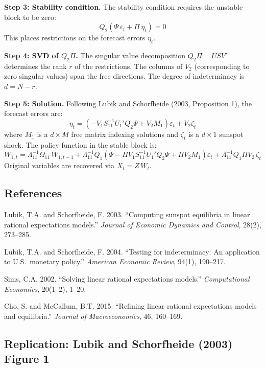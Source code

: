 \documentclass{article}
\begin{document}
\medskip
\noindent\textbf{Step 3: Stability condition.} The stability condition requires the unstable block to be zero:
\[
Q_2 (\Psi \, \varepsilon_t + \Pi \, \eta_t) = 0
\]
This places restrictions on the forecast errors $\eta_t$.

\medskip
\noindent\textbf{Step 4: SVD of $Q_2 \Pi$.} The singular value decomposition $Q_2 \Pi = U S V'$ determines the rank $r$ of the restrictions. The columns of $V_2$ (corresponding to zero singular values) span the free directions. The degree of indeterminacy is $d = N - r$.

\medskip
\noindent\textbf{Step 5: Solution.} Following Lubik and Schorfheide (2003, Proposition 1), the forecast errors are:
\[
\eta_t = \left(-V_1 S_{11}^{-1} U_1' Q_2 \Psi + V_2 M_1\right) \varepsilon_t + V_2 \zeta_t
\]
where $M_1$ is a $d \times M$ free matrix indexing solutions and $\zeta_t$ is a $d \times 1$ sunspot shock. The policy function in the stable block is:
\[
W_{1,t} = \Lambda_{11}^{-1} \Omega_{11} \, W_{1,t-1} + \Lambda_{11}^{-1} Q_1 \left(\Psi - \Pi V_1 S_{11}^{-1} U_1' Q_2 \Psi + \Pi V_2 M_1\right) \varepsilon_t + \Lambda_{11}^{-1} Q_1 \Pi V_2 \, \zeta_t
\]
Original variables are recovered via $X_t = Z \, W_t$.

\subsection{References}

Lubik, T.A. and Schorfheide, F. 2003. ``Computing sunspot equilibria in linear rational expectations models.'' \textit{Journal of Economic Dynamics and Control}, 28(2), 273--285.

\medskip
\noindent Lubik, T.A. and Schorfheide, F. 2004. ``Testing for indeterminacy: An application to U.S.\ monetary policy.'' \textit{American Economic Review}, 94(1), 190--217.

\medskip
\noindent Sims, C.A. 2002. ``Solving linear rational expectations models.'' \textit{Computational Economics}, 20(1--2), 1--20.

\medskip
\noindent Cho, S. and McCallum, B.T. 2015. ``Refining linear rational expectations models and equilibria.'' \textit{Journal of Macroeconomics}, 46, 160--169.

\subsection{Replication: Lubik and Schorfheide (2003) Figure 1}
\end{document}
